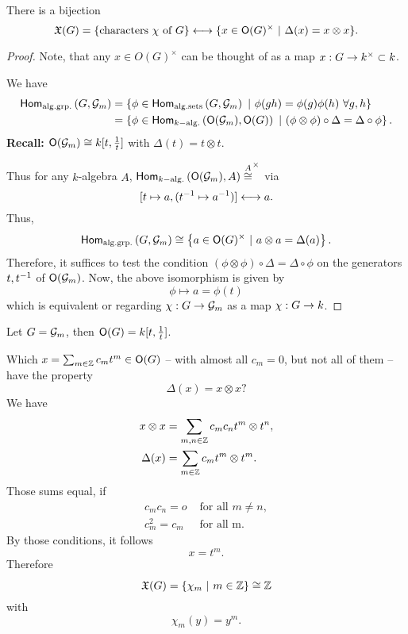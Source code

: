 \begin{lemma}
	There is a bijection
	\[ \mathfrak{X}(G) = \{ \text{characters } \chi \text{ of } G \} \longleftrightarrow \{ x \in \mathsf{O}(G)^\times ~|~ \Delta(x) = x \otimes x \}. \]
\end{lemma}
\begin{proof}
Note, that any $x \in O(G)^\times$ can be thought of as a map $x : G \overset{}{\rightarrow} k^\times \subset k$.

We have
\begin{align*}
\textsf{Hom}_{\mathrm{alg.grp.}}\left(G, \mathcal{G}_m\right) &= \left\lbrace\phi \in \textsf{Hom}_{\mathrm{alg.sets}}\left(G, \mathcal{G}_m\right) ~ | ~  \phi(gh) = \phi(g) \phi(h)~\forall g,h \right\rbrace\\
&= \left\lbrace\phi \in \textsf{Hom}_{k\mathrm{-alg.}}\left(\mathsf{O}(\mathcal{G}_m), \mathsf{O}(G)\right) ~ | ~ (\phi \otimes \phi) \circ \Delta = \Delta \circ \phi\right\rbrace.
\end{align*}
\textbf{Recall:} $\mathsf{O}(\mathcal{G}_m) \overset{}{\cong} k[t, \frac{1}{t}]$ with $\Delta(t) = t \otimes t$.

Thus for any $k$-algebra $A$, $\textsf{Hom}_{k\mathrm{-alg.}}\left(\mathsf{O}(\mathcal{G}_m), A\right) \overset{A}{\cong}^\times$ via
\[ [t \mapsto a, (t^{-1} \mapsto a^{-1})] \longleftrightarrow a. \]
Thus,
\begin{align*}
\textsf{Hom}_{\mathrm{alg.grp.}}\left(G, \mathcal{G}_m\right) \overset{}{\cong} \left\lbrace a \in \mathsf{O}(G)^\times ~ | ~  a \otimes a = \Delta(a) \right\rbrace.
\end{align*}
Therefore, it suffices to test the condition $ (\phi \otimes \phi ) \circ \Delta = \Delta \circ \phi $ on the generators $t,t^{-1}$ of $\mathsf{O}(\mathcal{G}_m)$.
Now, the above isomorphism is given by
\[ \phi \mapsto a = \phi(t) \]
which is equivalent or regarding $\chi : G \overset{}{\rightarrow} \mathcal{G}_m$ as a map $\chi : G \overset{}{\rightarrow} k$.
\end{proof}

\begin{example}
	Let $G = \mathcal{G}_m$, then $\mathsf{O}(G) = k[t, \frac{1}{t}]$.
	
	Which $x = \sum_{m \in \mathbb{Z}}c_mt^m \in \mathsf{O}(G)$ -- with almost all $c_m = 0$, but not all of them -- have the property
	\[ \Delta(x) = x\otimes x? \]
	We have
	\begin{align*}
	x \otimes x &= \sum_{m,n \in \mathbb{Z}} c_mc_n t^m \otimes t^n,\\
	\Delta(x) &= \sum_{m\in \mathbb{Z}} c_mt^m \otimes t^m.
	\end{align*}
	Those sums equal, if
	\begin{align*}
	c_mc_n = o & \text{ for all } m \neq n,\\
	c_m^2 = c_m & \text{ for all m}.
	\end{align*}
	By those conditions, it follows
	\[ x = t^m. \]
	Therefore
	\[ \mathfrak{X}(G) = \left\lbrace\chi_m ~ | ~ m \in \mathbb{Z}\right\rbrace \overset{}{\cong} \mathbb{Z}\]
	with
	\[ \chi_m(y) = y^m. \]
\end{example}


